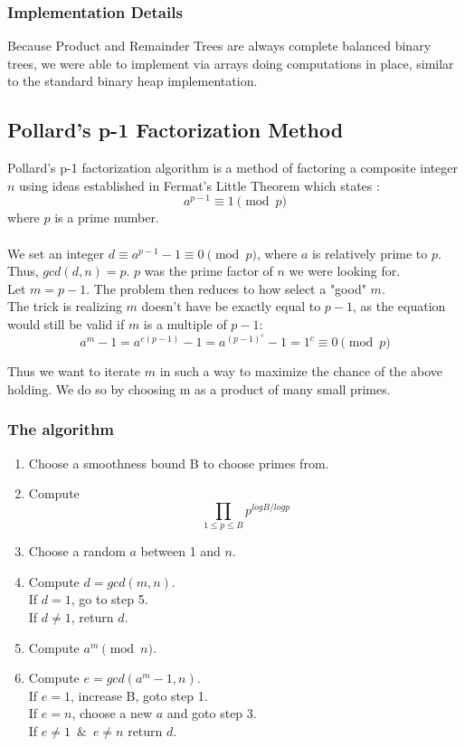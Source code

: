 \documentclass{article}
\begin{document}
        \subsubsection{Implementation Details}
        Because Product and Remainder Trees are always complete balanced binary trees, we were able to implement via arrays doing computations in place, similar to the standard binary heap implementation.  

        \subsection{Pollard's p-1 Factorization Method}

        Pollard's p-1 factorization algorithm is a method of factoring a composite integer $n$ using ideas established in Fermat's Little Theorem which states \autocite{Pollard1974}:
        $$a^{p-1}\equiv1\pmod p$$
        where $p$ is a prime number. \\ \\

        We set an integer $d \equiv a^{p-1} - 1 \equiv 0 \pmod p$, where $a$ is relatively prime to $p$.  Thus, $gcd(d, n) = p$.  $p$ was the prime factor of $n$ we were looking for. \\
        Let $m = p-1$.  The problem then reduces to how select a "good" $m$. \\
        The trick is realizing $m$ doesn't have be exactly equal to $p-1$, as the equation would still be valid if $m$ is a multiple of $p-1$:
        $$a^m-1 = a^{c(p-1)}-1 = a^{(p-1)^c}-1 = 1^c \equiv 0 \pmod p$$

        Thus we want to iterate $m$ in such a way to maximize the chance of the above holding.  We do so by choosing m as a product of many small primes.

        \subsubsection{The algorithm}

        \begin{enumerate}
          \item Choose a smoothness bound B to choose primes from.
          \item Compute $$\prod_{1 \leq p \leq B} p^{log{B}/log{p}}$$
          \item Choose a random $a$ between 1 and $n$.
          \item Compute $d=gcd(m, n)$. \\ If $d=1$, go to step 5.  \\  If $d\neq1$, return $d$.
          \item Compute $a^m \pmod n$.
          \item Compute $e = gcd(a^m - 1, n)$.  \\ If $e=1$, increase B, goto step 1.  \\  If $e=n$, choose a new $a$ and goto step 3.  \\  If $e\neq 1 \enspace \& \enspace e\neq n$ return $d$.
        \end{enumerate}
\end{document}
